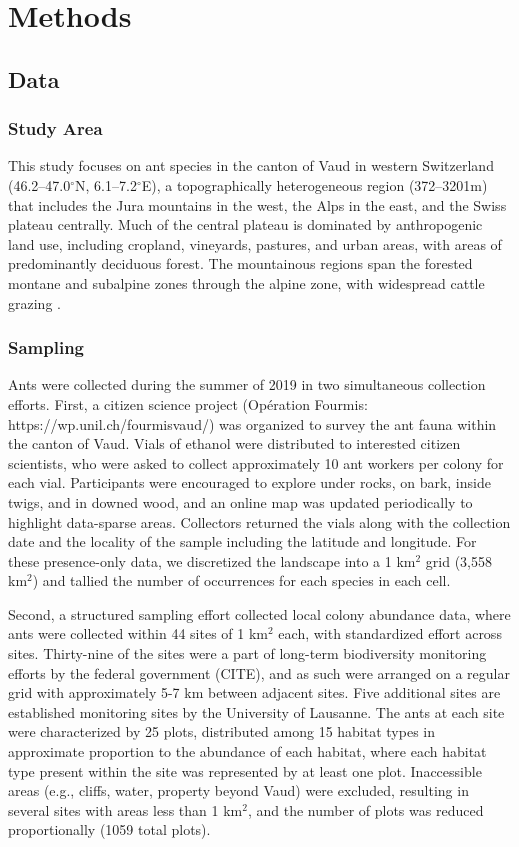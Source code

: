 \documentclass[review,preprint,3p]{elsarticle}
\begin{document}
	
	
	\section{Methods}
	\subsection{Data}
	\subsubsection{Study Area}
	This study focuses on ant species in the canton of Vaud in western Switzerland (46.2–47.0$^{\circ}$N, 6.1–7.2$^{\circ}$E), a topographically heterogeneous region (372–3201m) that includes the Jura mountains in the west, the Alps in the east, and the Swiss plateau centrally. Much of the central plateau is dominated by anthropogenic land use, including cropland, vineyards, pastures, and urban areas, with areas of predominantly deciduous forest. The mountainous regions span the forested montane and subalpine zones through the alpine zone, with widespread cattle grazing \cite{Delarze2015,Gago-Silva2017,Beck2017}. 
	
	\subsubsection{Sampling}
	Ants were collected during the summer of 2019 in two simultaneous collection efforts. First, a citizen science project (Opération Fourmis: https://wp.unil.ch/fourmisvaud/) was organized to survey the ant fauna within the canton of Vaud. Vials of ethanol were distributed to interested citizen scientists, who were asked to collect approximately 10 ant workers per colony for each vial. Participants were encouraged to explore under rocks, on bark, inside twigs, and in downed wood, and an online map was updated periodically to highlight data-sparse areas. Collectors returned the vials along with the collection date and the locality of the sample including the latitude and longitude. For these presence-only data, we discretized the landscape into a 1 km$^2$ grid (3,558 km$^2$) and tallied the number of occurrences for each species in each cell. 
	
	Second, a structured sampling effort collected local colony abundance data, where ants were collected within 44 sites of 1 km$^2$ each, with standardized effort across sites. Thirty-nine of the sites were a part of long-term biodiversity monitoring efforts by the federal government (CITE), and as such were arranged on a regular grid with approximately 5-7 km between adjacent sites. Five additional sites are established monitoring sites by the University of Lausanne. The ants at each site were characterized by 25 plots, distributed among 15 habitat types \cite{Gago-Silva2017} in approximate proportion to the abundance of each habitat, where each habitat type present within the site was represented by at least one plot. Inaccessible areas (e.g., cliffs, water, property beyond Vaud) were excluded, resulting in several sites with areas less than 1 km$^2$, and the number of plots was reduced proportionally (1059 total plots). 
	
\end{document}
